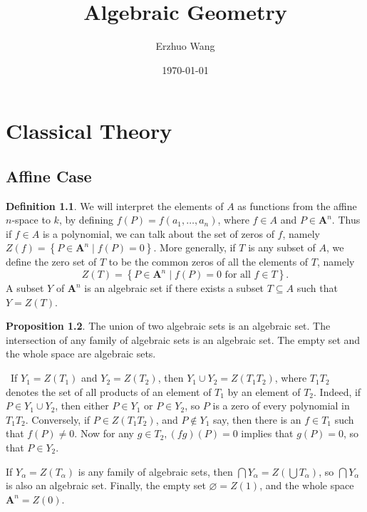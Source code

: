 \documentclass[12pt,a4paper]{book}
\newenvironment{prooff}{{\noindent\it\textcolor{cyan!40!black}{Proof}:}\,}{\par}
\theoremstyle{definition}
\newtheorem{defn}{Definition}[section]
\newtheorem{prop}[defn]{Proposition}
\begin{document}
\title{Algebraic Geometry}
\author{Erzhuo Wang}
\date{\today}
\maketitle %
\tableofcontents
\chapter{Classical Theory}
\section{Affine Case}
\begin{defn}
    We will interpret the elements of $A$ as functions from the affine $n$-space to $k$, by defining $f(P)=f\left(a_1, \ldots, a_n\right)$, where $f \in A$ and $P \in \mathbf{A}^n$. Thus if $f \in A$ is a polynomial, we can talk about the set of zeros of $f$, namely $Z(f)=\left\{P \in \mathbf{A}^n \mid f(P)=0\right\}$. More generally, if $T$ is any subset of $A$, we define the zero set of $T$ to be the common zeros of all the elements of $T$, namely
    $$
        Z(T)=\left\{P \in \mathbf{A}^n \mid f(P)=0 \text { for all } f \in T\right\} .
    $$
    A subset $Y$ of $\mathbf{A}^n$ is an algebraic set if there exists a subset $T \subseteq A$ such that $Y=Z(T)$.
\end{defn}
\begin{prop}
    The union of two algebraic sets is an algebraic set. The intersection of any family of algebraic sets is an algebraic set. The empty set and the whole space are algebraic sets.
\end{prop}
\begin{prooff}
    If $Y_1=Z\left(T_1\right)$ and $Y_2=Z\left(T_2\right)$, then $Y_1 \cup Y_2=Z\left(T_1 T_2\right)$, where $T_1 T_2$ denotes the set of all products of an element of $T_1$ by an element of $T_2$. Indeed, if $P \in Y_1 \cup Y_2$, then either $P \in Y_1$ or $P \in Y_2$, so $P$ is a zero of every polynomial in $T_1 T_2$. Conversely, if $P \in Z\left(T_1 T_2\right)$, and $P \notin Y_1$ say, then there is an $f \in T_1$ such that $f(P) \neq 0$. Now for any $g \in T_2,(f g)(P)=0$ implies that $g(P)=0$, so that $P \in Y_2$.


    If $Y_\alpha=Z\left(T_\alpha\right)$ is any family of algebraic sets, then $\bigcap Y_\alpha=Z\left(\bigcup T_\alpha\right)$, so $\bigcap Y_\alpha$ is also an algebraic set. Finally, the empty set $\varnothing=Z(1)$, and the whole space $\mathbf{A}^n=Z(0)$.
\end{prooff}
\end{document}
